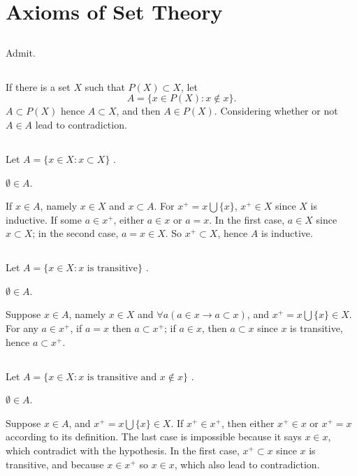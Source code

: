 \chapter {Axioms of Set Theory}


\section{}
Admit.


\section{}
If there is a set $X$ such that $P(X) \subset X$, let
\[ A = \{ x \in P(X) : x \notin x \}.\]
$A \subset P(X) $ hence $ A \subset X $, and then $ A \in P(X)$.
Considering whether or not $A \in A$ lead to contradiction.


\section{}
Let $ A = \{ x\in X : x \subset X \}$ .

$ \emptyset \in A $.

If $ x \in A $, namely $ x \in X $ and $ x \subset A $. For $ x^+ = x \bigcup \{x\} $,
$ x^+ \in X $ since $X$ is inductive. If some $ a \in x^+ $, either $ a \in x $ or
$ a = x $. In the first case, $ a \in X $ since $ x \subset X $; in the second case,
$ a = x \in X $. So $ x^+ \subset X $, hence $A$ is inductive.


\section{}
Let $ A = \{ x \in X : x \text{ is transitive} \} $ .

$ \emptyset \in A $.

Suppose $ x \in A $, namely $ x \in X $ and $ \forall{a}( a\in x \rightarrow a \subset x ) $,
and $ x^+ = x \bigcup \{x\} \in X $. For any $ a \in x^+ $, if $ a = x $ then $ a \subset x^+ $;
if $ a \in x $, then $ a \subset x $ since $x$ is transitive, hence $ a \subset x^+ $.


\section{}
Let $ A = \{ x \in X : x \text{ is transitive and } x \notin x \} $ .

$ \emptyset \in A $.

Suppose $ x \in A $, and $ x^+ = x \bigcup \{x\} \in X $. If $ x^+ \in x^+ $, then either 
$ x^+ \in x $ or $ x^+ = x $ according to its definition. The last case is impossible because 
it says $ x \in x $, which contradict with the hypothesis. In the first case, $ x^+ \subset x $
since $x$ is transitive, and because $ x \in x^+ $ so $ x \in x $, which also lead to contradiction.


